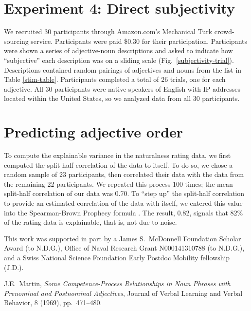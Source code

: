 \documentclass{pnastwo}
\begin{document}
\begin{article}
\begin{materials}
\section{Experiment 4: Direct subjectivity}
We recruited 30 participants through Amazon.com's Mechanical Turk crowd-sourcing service. Participants were paid \$0.30 for their participation. Participants were shown a series of adjective-noun descriptions and asked to indicate how ``subjective'' each description was on a sliding scale (Fig.~\ref{subjectivity-trial}). Descriptions contained random pairings of adjectives and nouns from the list in Table \ref{stim-table}. Participants completed a total of 26 trials, one for each adjective. All 30 participants were native speakers of English with IP addresses located within the United States, so we analyzed data from all 30 participants.

\section{Predicting adjective order}
To compute the explainable variance in the naturalness rating data, we first computed the split-half correlation of the data to itself. To do so, we chose a random sample of 23 participants, then correlated their data with the data from the remaining 22 participants. We repeated this process 100 times; the mean split-half correlation of our data was 0.70. To ``step up'' the split-half correlation to provide an estimated correlation of the data with itself, we entered this value into the Spearman-Brown Prophecy formula \cite{stanley1971}. The result, 0.82, signals that 82\% of the rating data is explainable, that is, not due to noise.

\end{materials}


\begin{acknowledgments}
This work was supported in part by a James S.~McDonnell Foundation Scholar Award (to N.D.G.), Office of Naval Research Grant N000141310788 (to N.D.G.), and a Swiss National Science Foundation Early Postdoc Mobility fellowship (J.D.).
\end{acknowledgments}

\begin{thebibliography}{10}

	J.E.~Martin, {\em Some Competence-Process Relationships in Noun Phrases with Prenominal and Postnominal Adjectives}, Journal of Verbal Learning and Verbal Behavior, 8 (1969), pp.~471--480. 	
	

\end{thebibliography}
\end{article}
\end{document}
